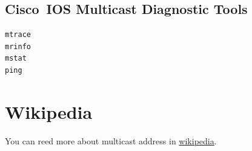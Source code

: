 \documentclass{UTNetLab}
\begin{document}
\begin{appendices}
\begin{subappendices}
\subsection{Cisco~IOS Multicast Diagnostic Tools}

    \begin{lstlisting}[language={cisco}]
mtrace
mrinfo
mstat
ping
    \end{lstlisting}
    
\end{subappendices}

\section{Wikipedia}
    You can reed more about multicast address in \href{https://en.wikipedia.org/wiki/Multicast_address}{wikipedia}.

\end{appendices}
\end{document}
